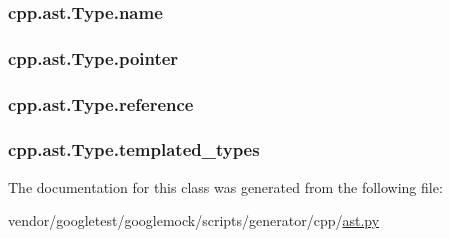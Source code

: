 \subsubsection[{\texorpdfstring{name}{name}}]{\setlength{\rightskip}{0pt plus 5cm}cpp.\+ast.\+Type.\+name}\hypertarget{classcpp_1_1ast_1_1Type_a5905424e2b65f0215b6ecd73b4bfe24c}{}\label{classcpp_1_1ast_1_1Type_a5905424e2b65f0215b6ecd73b4bfe24c}
\subsubsection[{\texorpdfstring{pointer}{pointer}}]{\setlength{\rightskip}{0pt plus 5cm}cpp.\+ast.\+Type.\+pointer}\hypertarget{classcpp_1_1ast_1_1Type_a37234bb68915c93894cbc8e366c1eaad}{}\label{classcpp_1_1ast_1_1Type_a37234bb68915c93894cbc8e366c1eaad}
\subsubsection[{\texorpdfstring{reference}{reference}}]{\setlength{\rightskip}{0pt plus 5cm}cpp.\+ast.\+Type.\+reference}\hypertarget{classcpp_1_1ast_1_1Type_a8d2cddd631397c3bf86198cc420d584d}{}\label{classcpp_1_1ast_1_1Type_a8d2cddd631397c3bf86198cc420d584d}
\subsubsection[{\texorpdfstring{templated\+\_\+types}{templated_types}}]{\setlength{\rightskip}{0pt plus 5cm}cpp.\+ast.\+Type.\+templated\+\_\+types}\hypertarget{classcpp_1_1ast_1_1Type_a7c38fcafa00dae6ee22bab783086a1a7}{}\label{classcpp_1_1ast_1_1Type_a7c38fcafa00dae6ee22bab783086a1a7}


The documentation for this class was generated from the following file\+:\begin{DoxyCompactItemize}
\item 
vendor/googletest/googlemock/scripts/generator/cpp/\hyperlink{ast_8py}{ast.\+py}\end{DoxyCompactItemize}
